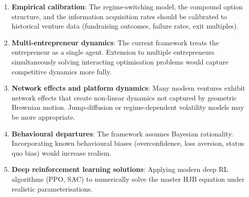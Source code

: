 \documentclass[12pt,a4paper,oneside]{book}
\theoremstyle{definition}
\theoremstyle{remark}
\begin{document}
\begin{enumerate}
  \item \textbf{Empirical calibration}: The regime-switching model, the compound option
    structure, and the information acquisition rates should be calibrated to historical
    venture data (fundraising outcomes, failure rates, exit multiples).
  \item \textbf{Multi-entrepreneur dynamics}: The current framework treats the
    entrepreneur as a single agent. Extension to multiple entrepreneurs simultaneously
    solving interacting optimisation problems would capture competitive dynamics more
    fully.
  \item \textbf{Network effects and platform dynamics}: Many modern ventures exhibit
    network effects that create non-linear dynamics not captured by geometric Brownian
    motion. Jump-diffusion or regime-dependent volatility models may be more appropriate.
  \item \textbf{Behavioural departures}: The framework assumes Bayesian rationality.
    Incorporating known behavioural biases (overconfidence, loss aversion, status quo
    bias) would increase realism.
  \item \textbf{Deep reinforcement learning solutions}: Applying modern deep RL
    algorithms (PPO, SAC) to numerically solve the master HJB equation under realistic
    parameterisations.
\end{enumerate}

\newpage
{}
{}
\end{document}
